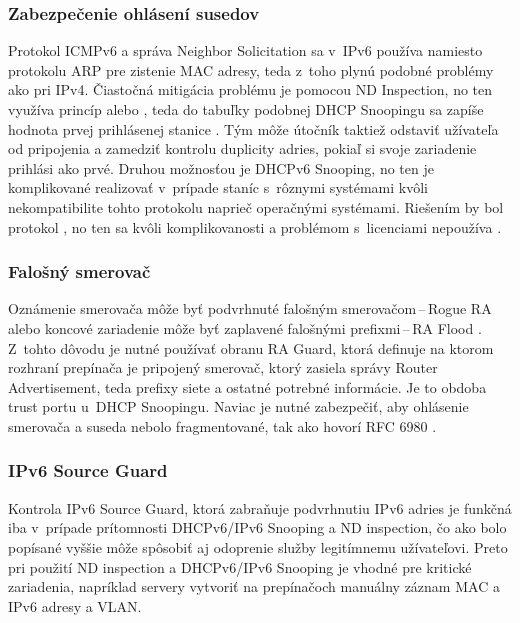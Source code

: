 \subsubsection{Zabezpečenie ohlásení susedov}
Protokol ICMPv6 a správa Neighbor Solicitation sa v~IPv6 používa namiesto protokolu ARP pre zistenie MAC adresy, teda z~toho plynú podobné problémy ako pri IPv4. Čiastočná mitigácia problému je pomocou ND Inspection, no ten využíva princíp  alebo , teda do tabuľky podobnej DHCP Snoopingu sa zapíše hodnota prvej prihlásenej stanice \cite{Gregr522015}\cite{Podermanski1222015}. Tým môže útočník taktiež odstaviť užívateľa od pripojenia a zamedziť kontrolu duplicity adries, pokiaľ si svoje zariadenie prihlási ako prvé. Druhou možnosťou je DHCPv6 Snooping, no ten je komplikované realizovať v~prípade staníc s~rôznymi systémami kvôli nekompatibilite tohto protokolu naprieč operačnými systémami. Riešením by bol protokol , no ten sa kvôli komplikovanosti a problémom s~licenciami nepoužíva \cite{Alsadeh1252015}.   

\subsubsection{Falošný smerovač}
Oznámenie smerovača môže byť podvrhnuté falošným smerovačom\,--\,Rogue RA alebo koncové zariadenie môže byť zaplavené falošnými prefixmi\,--\,RA Flood \cite{Gregr522015}\cite{Podermanski1222015}. Z~tohto dôvodu je nutné používať obranu RA Guard, ktorá definuje na ktorom rozhraní prepínača je pripojený smerovač, ktorý zasiela správy Router Advertisement, teda prefixy siete a ostatné potrebné informácie. Je to obdoba trust portu u~DHCP Snoopingu. Naviac je nutné zabezpečiť, aby ohlásenie smerovača a suseda nebolo fragmentované, tak ako hovorí RFC 6980 \cite{rfc6980YBLH6JtaHyFaxE8i}.

\subsubsection{IPv6 Source Guard}
Kontrola IPv6 Source Guard, ktorá zabraňuje podvrhnutiu IPv6 adries je funkčná iba v~prípade prítomnosti DHCPv6/IPv6 Snooping a ND inspection, čo ako bolo popísané vyššie môže spôsobiť aj odoprenie služby legitímnemu užívateľovi. Preto pri použití ND inspection a DHCPv6/IPv6 Snooping je vhodné pre kritické zariadenia, napríklad servery vytvoriť na prepínačoch manuálny záznam MAC a IPv6 adresy a VLAN.    

